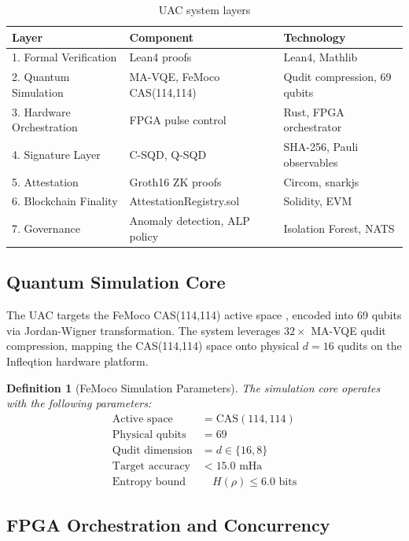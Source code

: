 \documentclass[11pt,a4paper]{article}
\newtheorem{definition}{Definition}
\theoremstyle{plain}
\begin{document}
\begin{table}[h]
\centering
\begin{tabular}{lll}
\toprule
\textbf{Layer} & \textbf{Component} & \textbf{Technology} \\
\midrule
1. Formal Verification & Lean4 proofs & Lean4, Mathlib \\
2. Quantum Simulation & MA-VQE, FeMoco CAS(114,114) & Qudit compression, 69 qubits \\
3. Hardware Orchestration & FPGA pulse control & Rust, FPGA orchestrator \\
4. Signature Layer & C-SQD, Q-SQD & SHA-256, Pauli observables \\
5. Attestation & Groth16 ZK proofs & Circom, snarkjs \\
6. Blockchain Finality & AttestationRegistry.sol & Solidity, EVM \\
7. Governance & Anomaly detection, ALP policy & Isolation Forest, NATS \\
\bottomrule
\end{tabular}
\caption{UAC system layers}
\label{tab:layers}
\end{table}

\subsection{Quantum Simulation Core}

The UAC targets the FeMoco CAS(114,114) active space \cite{feMocoCAS}, encoded into 69 qubits via Jordan-Wigner transformation. The system leverages $32\times$ MA-VQE qudit compression, mapping the CAS(114,114) space onto physical $d = 16$ qudits on the Infleqtion hardware platform.

\begin{definition}[FeMoco Simulation Parameters]
The simulation core operates with the following parameters:
\begin{align}
    \text{Active space} &= \text{CAS}(114,114) \\
    \text{Physical qubits} &= 69 \\
    \text{Qudit dimension} &= d \in \{16, 8\} \\
    \text{Target accuracy} &< 15.0 \text{ mHa} \\
    \text{Entropy bound} &\quad H(\rho) \leq 6.0 \text{ bits}
\end{align}
\end{definition}

\subsection{FPGA Orchestration and Concurrency}
\end{document}

